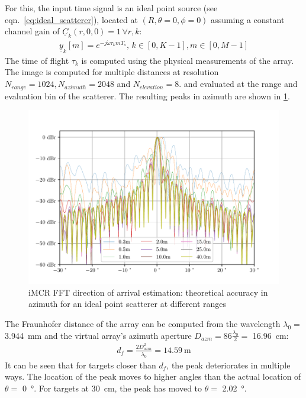 For this, the input time signal is an ideal point source (see eqn.\ \ref{eq:ideal_scatterer}),
located at $(R,\theta=0,\phi=0)$
assuming a constant channel gain of $\underline C_k(r,0,0)=1 \,\forall r,k$:
\begin{align}
    \underline y_k[m] =  e^{-j\dot \omega \tau_k m T_s}    ,\,k\in[0,K-1],m\in[0,M-1]
\end{align}
The time of flight $\tau_k$ is computed using the physical measurements of the array.
\\
The image is computed for multiple distances at resolution
$N_{range} = 1024, N_{azimuth} = 2048$ and $N_{elevation} = 8$.
and evaluated at the range and evaluation bin of the scatterer.
The resulting peaks in azimuth are shown in \cref{fig:fft_azm_peak}.
\begin{figure}[h]
    \centering
    \includegraphics[width=\textwidth]{../figures/fft_azm_peak.pdf}
    \caption{iMCR FFT direction of arrival estimation: theoretical accuracy in azimuth for an ideal point scatterer at different ranges}
    \label{fig:fft_azm_peak}
\end{figure}

The Fraunhofer distance of the array can be computed from the wavelength $\lambda_0=$ \SIlist{3.944}{\mm}
and the virtual array's azimuth aperture $D_{azm} = 86 \frac{\lambda_0}{2}=$ \SI{16.96}{\cm}:
\begin{align}
    d_f  = \frac{2D_{azm}^2}{\lambda_0}
    = \SI{14.59}{\m}
\end{align}
It can be seen that for targets closer than $d_f$, the peak deteriorates in multiple ways.
The location of the peak moves to higher angles than the actual location of $\theta =$ \SI{0}{\degree}.
For targets at \SI{30}{\cm}, the peak has moved to $\theta =$ \SI{2.02}{\degree}.

